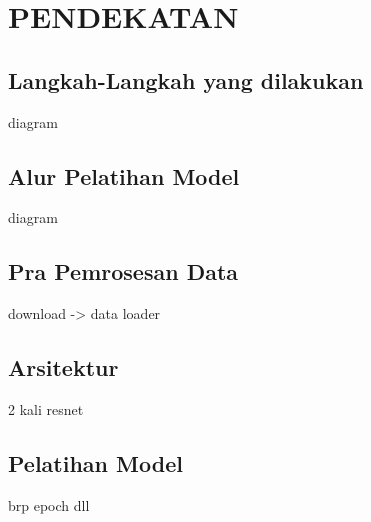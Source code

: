 
\chapter{PENDEKATAN}
\label{cha:3-Pendekatan}

\section{Langkah-Langkah yang dilakukan}
\label{sec:3-Motivasi}

diagram

\section{Alur Pelatihan Model}
diagram

\section{Pra Pemrosesan Data}
download -> data loader

\section{Arsitektur}
2 kali resnet

\section{Pelatihan Model}
brp epoch dll
